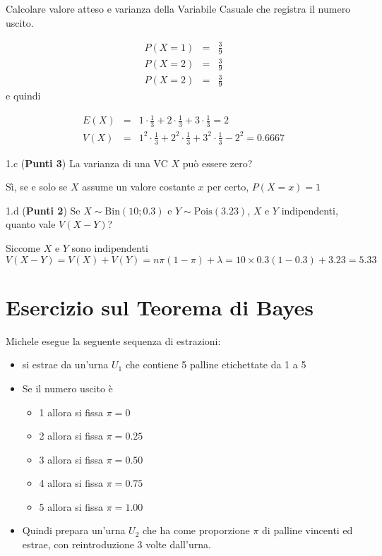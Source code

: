 \documentclass[
  11pt,
]{book}
\providecommand{\tightlist}{%
  \setlength{\itemsep}{0pt}\setlength{\parskip}{0pt}}
\theoremstyle{mytheoremstyle}
\theoremstyle{mydefstyle}
\newenvironment{sol}
  {
  \begin{tcolorbox}[enhanced,breakable,arc=0.1mm,boxrule=1pt,colback=white,colframe=iblue,
  title=\bf \fontfamily{lmss}\selectfont \hspace{.5 cm} Soluzione,drop fuzzy shadow]

}{
\end{tcolorbox}
  }
\begin{document}
Calcolare valore atteso e varianza della Variabile Casuale che registra il numero uscito.

\begin{sol}
\begin{eqnarray*}
P(X=1)&=& \frac 39\\
P(X=2)&=& \frac 39\\
P(X=2)&=& \frac 39
\end{eqnarray*}
e quindi

\begin{eqnarray*}
E(X)&=& 1\cdot\frac 13 +2\cdot\frac 13 +3\cdot\frac 13 =2\\
V(X)&=& 1^2\cdot\frac 13 +2^2\cdot\frac 13 +3^2\cdot\frac 13 - 2^2=0.6667
\end{eqnarray*}

\end{sol}

1.c (\textbf{Punti 3}) La varianza di una VC \(X\) può essere zero?

\begin{sol}
Sì, se e solo se \(X\) assume un valore costante \(x\) per certo, \(P(X=x)=1\)

\end{sol}

1.d (\textbf{Punti 2}) Se \(X\sim\text{Bin}(10;0.3)\) e \(Y\sim\text{Pois}(3.23)\),
\(X\) e \(Y\) indipendenti, quanto vale \(V(X-Y)\)?

\begin{sol}
Siccome \(X\) e \(Y\) sono indipendenti
\[
V(X-Y)=V(X)+V(Y)=n\pi(1-\pi)+\lambda=10\times 0.3(1-0.3)+3.23=5.33
\]

\end{sol}

\section{Esercizio sul Teorema di Bayes}\label{esercizio-sul-teorema-di-bayes}

Michele esegue la seguente sequenza di estrazioni:

\begin{itemize}
\tightlist
\item
  si estrae da un'urna \(U_1\) che contiene 5 palline etichettate da 1 a 5
\item
  Se il numero uscito è

  \begin{itemize}
  \tightlist
  \item
    1 allora si fissa \(\pi=0\)
  \item
    2 allora si fissa \(\pi=0.25\)
  \item
    3 allora si fissa \(\pi=0.50\)
  \item
    4 allora si fissa \(\pi=0.75\)
  \item
    5 allora si fissa \(\pi=1.00\)
  \end{itemize}
\item
  Quindi prepara un'urna \(U_2\) che ha come proporzione \(\pi\) di palline vincenti ed estrae,
  con reintroduzione 3 volte dall'urna.
\end{itemize}
\end{document}
